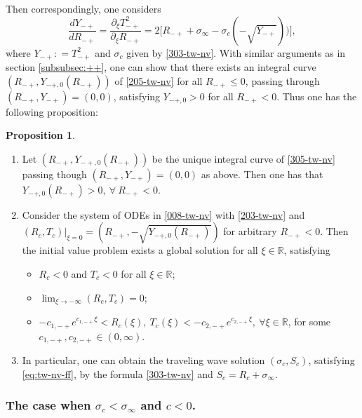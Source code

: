 \documentclass[12pt]{article}
\theoremstyle{definition}
\newtheorem{proposition}[theorem]{Proposition}
\theoremstyle{remark}
\numberwithin{equation}{section}
\begin{document}
Then correspondingly, one considers
\begin{equation}
    \label{305-tw-nv}
    \frac{d Y_{-+}}{d R_{-+}} = \frac{\partial_\xi T_{-+}^2}{\partial_\xi R_{-+}} = 2 \lbrack R_{-+} + \sigma_\infty - \sigma_c( - \sqrt{Y_{-+}}) )\rbrack, 
\end{equation}
where $ Y_{-+} : = T_{-+}^2 $ and $ \sigma_c $ given by \eqref{303-tw-nv}. With similar arguments as in section \ref{subsubsec:++}, one can show that there exists an integral curve $ (R_{-+}, Y_{-+,0}(R_{-+})) $ of \eqref{205-tw-nv} for all $ R_{-+} \leq 0 $,  passing through $ (R_{-+}, Y_{-+}) = (0,0) $, satisfying  $ Y_{-+,0} > 0 $ for all $ R_{-+} < 0 $. Thus one has the following proposition:
\begin{proposition}
    \label{prop:tw-+}
    \begin{enumerate}
    \item Let $ (R_{-+}, Y_{{-+},0}(R_{-+}) ) $ be the unique integral curve of \eqref{305-tw-nv} passing though $ (R_{-+}, Y_{-+}) = (0,0) $ as above. Then one has that $ Y_{-+,0}(R_{-+}) > 0, \ \forall \ R_{-+} < 0 $.   

    \item 
    Consider the system of ODEs in \eqref{008-tw-nv} with \eqref{203-tw-nv} and $ (R_c, T_c)\vert_{\xi = 0} = (R_{-+}, -\sqrt{Y_{-+,0}(R_{-+})}) $ for arbitrary $ R_{-+} < 0 $. 
    Then the initial value problem exists a global solution for all $ \xi \in \mathbb R $, satisfying
    \begin{itemize}
        \item $ R_c < 0 $ and $ T_c < 0 $ for all $ \xi \in \mathbb R $; 
        \item $ \lim_{\xi\rightarrow -\infty} (R_c, T_c) = 0 $;
        \item $ -c_{1,-+} e^{ c_{1,-+} \xi} < R_c(\xi) , \ T_c(\xi) < -c_{2,-+} e^{ c_{2,-+} \xi}, \ \forall \xi \in \mathbb R $, for some $ c_{1,-+}, c_{2,-+} \in (0,\infty) $. 
    \end{itemize}

    \item
    In particular, one can obtain the traveling wave solution $ (\sigma_c, S_c) $, satisfying \eqref{eq:tw-nv-ff}, by the formula \eqref{303-tw-nv} and $ S_c = R_c + \sigma_\infty $. 
    \end{enumerate}
\end{proposition}

\subsubsection{The case when $ \sigma_c < \sigma_\infty $ and $ c < 0 $.}\label{subsubsec:--}
\end{document}
